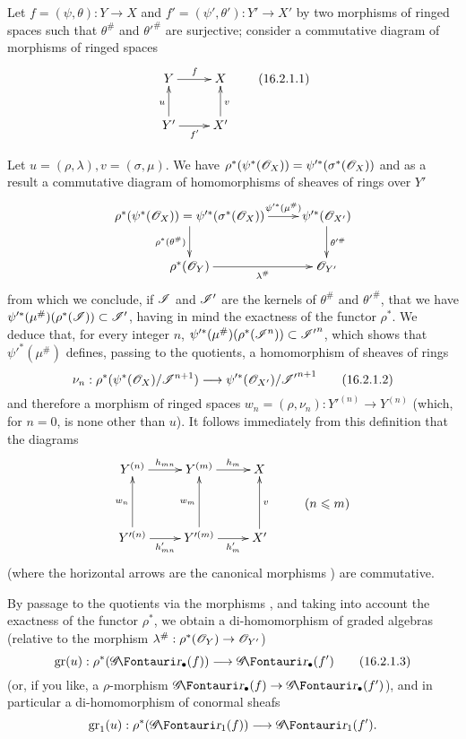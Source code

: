 \begin{env}[16.2.1]
\label{IV.16.2.1}
Let $f = (\psi, \theta): Y \to X$ and $f' = (\psi', \theta'): Y' \to X'$ by two morphisms of ringed spaces such that $\theta^\#$ and $\theta'^\#$ are surjective;
consider a commutative diagram of morphisms of ringed spaces
\[
  \label{IV.16.2.1.1}
  \xymatrix{
    Y \ar[r]^f & X \\
    Y'\ar[r]_{f'} \ar[u]^u & X'\ar[u]_v  
  }
  \tag{16.2.1.1}
\]

Let $u = (\rho, \lambda), v = (\sigma, \mu)$. 
We have $\rho^*(\psi^*(\mathscr{O}_X)) = \psi'^*(\sigma^*(\mathscr{O}_X))$ and as a result a commutative diagram of homomorphisms of sheaves of rings over $Y'$
\[
  \xymatrix{
    \rho^*(\psi^*(\sh{O}_X)) = \psi'^*(\sigma^*(\sh{O}_X)) \ar[r]^-{\psi'^*(\mu^\#)}\ar[d]_{\rho^*(\theta^\#)} & \psi'^*(\sh{O}_{X'}) \ar[d]^{\theta'^\#} \\
    \rho^*(\sh{O}_Y)\ar[r]_-{\lambda^\#}  & \sh{O}_{Y'}  
  }
\]
from which we conclude, if $\mathscr{I}$ and $\mathscr{I'}$ are the kernels of $\theta^\#$ and $\theta'^\#$, that we have $\psi'^*(\mu^\#)(\rho^*(\mathscr{I})) \subset \mathscr{I'}$, having in mind the exactness of the functor $\rho^*$.
We deduce that, for every integer $n$, $\psi'^*(\mu^\#)(\rho^*(\mathscr{I}^n)) \subset \mathscr{I'}^n$, which shows that $\psi'^*(\mu^\#)$ defines, passing to the quotients, a homomorphism of sheaves of rings
\[
  \label{IV.16.2.1.2}
  \nu_n: \rho^*(\psi^*(\sh{O}_X)/\sh{I}^{n+1}) \to \psi'^*(\sh{O}_{X'})/\sh{I'}^{n+1}
  \tag{16.2.1.2}
\]
and therefore a morphism of ringed spaces $w_n = (\rho, \nu_n): Y'^{(n)} \to Y^{(n)}$ (which, for $n = 0$, is none other than $u$).
It follows immediately from this definition that the diagrams
\[
  \xymatrix@R=1pc{
    Y^{(n)} \ar[r]^-{h_{mn}} & Y^{(m)} \ar[r]^-{h_m} & X \\
    & & & (n \leq m) \\
    Y'^{(n)} \ar[r]_-{h'_{mn}} \ar[uu]^-{w_n} & Y'^{(m)} \ar[r]_-{h'_m} \ar[uu]^-{w_m} & X' \ar[uu]_-v \\
  }
\]
(where the horizontal arrows are the canonical morphisms ) are commutative.

By passage to the quotients via the morphisms , and taking into
account the exactness of the functor $\rho^*$, we obtain a di-homomorphism of graded algebras (relative to the morphism $\lambda^\#: \rho^*(\sh{O}_Y) \to \sh{O}_{Y'}$)
\[
  \label{IV.16.2.1.3}
  \gr(u): \rho^*(\shGr_\bullet(f)) \to \shGr_\bullet(f')
  \tag{16.2.1.3}
\]
(or, if you like, a $\rho$-morphism  $\shGr_\bullet(f) \to \shGr_\bullet(f')$), and in particular a di-homomorphism of conormal sheafs
\[
  \gr_1(u): \rho^*(\shGr_1(f)) \to \shGr_1(f').
\]


\end{env}
